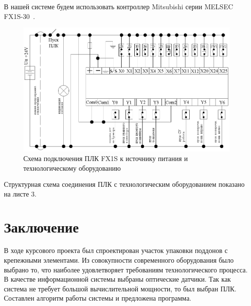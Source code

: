 В нашей системе будем использовать контроллер Mitsubishi серии MELSEC FX1S-30~\cite{labs}.

\begin{figure}[ht]
    \includegraphics[width=.6\linewidth]{Figures/conjunctions.png}
    \caption{Схема подключения ПЛК FX1S к источнику питания и технологическому оборудованию}
    \label{fig:conjunctions}
\end{figure}

Структурная схема соединения ПЛК с технологическим оборудованием показано на листе 3.

\section*{Заключение}

В ходе курсового проекта был спроектирован участок упаковки поддонов с крепежными элементами. Из совокупности современного оборудования было выбрано то, что наиболее удовлетворяет требованиям технологического процесса. В качестве информационной системы выбраны оптические датчики. Так как система не требует большой вычислительной мощности, то был выбран ПЛК. Составлен алгоритм работы системы и предложена программа.


